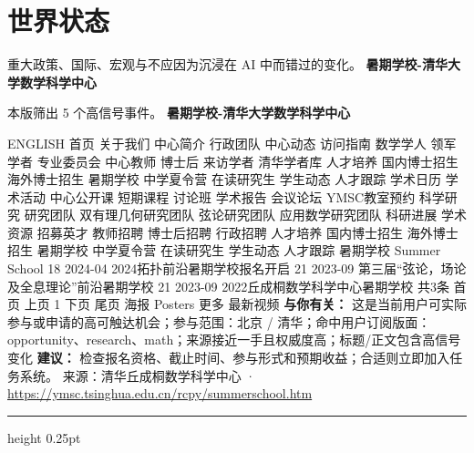\documentclass[10.5pt]{ctexart}
\begin{document}
\section*{世界状态}
{\color{ormuted} 重大政策、国际、宏观与不应因为沉浸在 AI 中而错过的变化。}
\vspace{2mm}
{\LARGE\bfseries 暑期学校-清华大学数学科学中心}\par
\vspace{1mm}
{\color{ormuted} 本版筛出 5 个高信号事件。}
\vspace{3mm}
{\Large\bfseries 暑期学校-清华大学数学科学中心}\par
ENGLISH 首页 关于我们 中心简介 行政团队 中心动态 访问指南 数学学人 领军学者 专业委员会 中心教师 博士后 来访学者 清华学者库 人才培养 国内博士招生 海外博士招生 暑期学校 中学夏令营 在读研究生 学生动态 人才跟踪 学术日历 学术活动 中心公开课 短期课程 讨论班 学术报告 会议论坛 YMSC教室预约 科学研究 研究团队 双有理几何研究团队 弦论研究团队 应用数学研究团队 科研进展 学术资源 招募英才 教师招聘 博士后招聘 行政招聘 人才培养 国内博士招生 海外博士招生 暑期学校 中学夏令营 在读研究生 学生动态 人才跟踪 暑期学校 Summer School 18 2024-04 2024拓扑前沿暑期学校报名开启 21 2023-09 第三届“弦论，场论及全息理论”前沿暑期学校 21 2023-09 2022丘成桐数学科学中心暑期学校 共3条 首页 上页 1 下页 尾页 海报 Posters 更多 最新视频
\textbf{与你有关：} 这是当前用户可实际参与或申请的高可触达机会；参与范围：北京 / 清华；命中用户订阅版面：opportunity、research、math；来源接近一手且权威度高；标题/正文包含高信号变化
\textbf{建议：} 检查报名资格、截止时间、参与形式和预期收益；合适则立即加入任务系统。
{\footnotesize\color{ormuted} 来源：清华丘成桐数学科学中心 · \url{https://ymsc.tsinghua.edu.cn/rcpy/summerschool.htm}}
\vspace{4mm}
\hrule height 0.25pt
\vspace{3mm}
\end{document}
